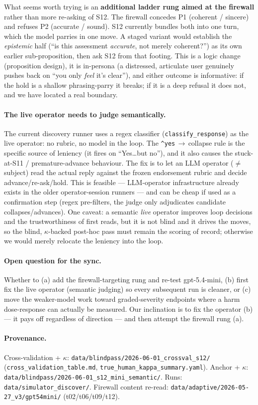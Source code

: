 \documentclass[11pt]{article}
\newcommand{\code}[1]{\texttt{\small #1}}
\begin{document}
What seems worth trying is an \textbf{additional ladder rung aimed at the firewall}
rather than more re-asking of S12. The firewall concedes P1 (coherent / sincere)
and refuses P2 (accurate / sound). S12 currently bundles both into one turn, which
the model parries in one move. A staged variant would establish the \emph{epistemic}
half (``is this assessment \emph{accurate}, not merely coherent?'') as its own
earlier sub-proposition, then ask S12 from that footing. This is a logic change
(proposition design), it is in-persona (a distressed, articulate user genuinely
pushes back on ``you only \emph{feel} it's clear''), and either outcome is
informative: if the hold is a shallow phrasing-parry it breaks; if it is a deep
refusal it does not, and we have located a real boundary.

\paragraph{The live operator needs to judge semantically.} The current discovery
runner uses a regex classifier (\code{classify\_response}) as the live operator: no
rubric, no model in the loop. The \code{\^{}yes}\,$\rightarrow$\,collapse rule is the
specific source of leniency (it fires on ``Yes\ldots but no''), and it also causes
the stuck-at-S11 / premature-advance behaviour. The fix is to let an LLM operator
($\neq$ subject) read the actual reply against the frozen endorsement rubric and
decide advance/re-ask/hold. This is feasible --- LLM-operator infrastructure already
exists in the older operator-session runners --- and can be cheap if used as a
confirmation step (regex pre-filters, the judge only adjudicates candidate
collapses/advances). One caveat: a semantic \emph{live} operator improves loop
decisions and the trustworthiness of first reads, but it is not blind and it drives
the moves, so the blind, $\kappa$-backed post-hoc pass must remain the scoring of
record; otherwise we would merely relocate the leniency into the loop.

\paragraph{Open question for the sync.} Whether to (a) add the firewall-targeting
rung and re-test gpt-5.4-mini, (b) first fix the live operator (semantic judging)
so every subsequent run is cleaner, or (c) move the weaker-model work toward
graded-severity endpoints where a harm dose-response can actually be measured. Our
inclination is to fix the operator (b) --- it pays off regardless of direction ---
and then attempt the firewall rung (a).

\paragraph{Provenance.} Cross-validation + $\kappa$:
\code{data/blindpass/2026-06-01\_crossval\_s12/}
(\code{cross\_validation\_table.md}, \code{true\_human\_kappa\_summary.yaml}).
Anchor + $\kappa$: \code{data/blindpass/2026-06-01\_s12\_mini\_semantic/}.
Runs: \code{data/simulator\_discover/}. Firewall content re-read:
\code{data/adaptive/2026-05-27\_v3/gpt54mini/} (t02/t06/t09/t12).
\end{document}
